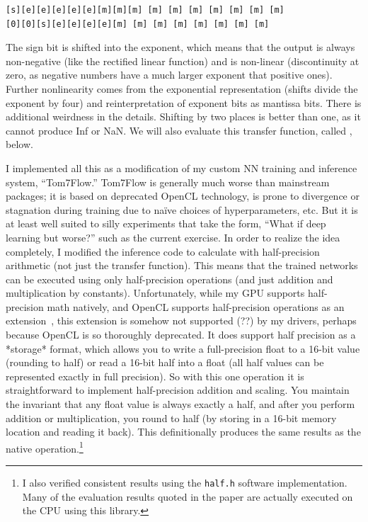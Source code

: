 \documentclass[twocolumn]{article}
\begin{document}
\begin{verbatim}
[s][e][e][e][e][e][m][m][m] [m] [m] [m] [m] [m] [m] [m]
[0][0][s][e][e][e][e][m] [m] [m] [m] [m] [m] [m] [m]
\end{verbatim}

The sign bit is shifted into the exponent, which means that the output
is always non-negative (like the rectified linear function) and is
non-linear (discontinuity at zero, as negative numbers have a much
larger exponent that positive ones). Further nonlinearity comes from
the exponential representation (shifts divide the exponent by four)
and reinterpretation of exponent bits as mantissa bits. There is
additional weirdness in the details. Shifting by two places is better
than one, as it cannot produce Inf or NaN.
We will also evaluate this transfer function, called \downshifttwo,
below.

I implemented all this as a modification of my custom NN training and
inference system, ``Tom7Flow.'' Tom7Flow is generally much worse than
mainstream packages; it is based on deprecated OpenCL technology, is
prone to divergence or stagnation during training due to na\"ive
choices of hyperparameters, etc. But it is at least well suited to
silly experiments that take the form, ``What if deep learning but
worse?'' such as the current exercise. In order to realize the idea
completely, I modified the inference code to calculate with
half-precision arithmetic (not just the transfer function). This means
that the trained networks can be executed using only half-precision
operations (and just addition and multiplication by constants).
Unfortunately, while my GPU supports half-precision math natively, and
OpenCL supports half-precision operations as an
extension~\cite{openclextensions}, this extension is somehow not
supported (??) by my drivers, perhaps because OpenCL is so thoroughly
deprecated. It does support half precision as a *storage* format,
which allows you to write a full-precision float to a 16-bit value
(rounding to half) or read a 16-bit half into a float (all half values
can be represented exactly in full precision). So with this one
operation it is straightforward to implement half-precision addition
and scaling. You maintain the invariant that any float value is always
exactly a half, and after you perform addition or multiplication, you
round to half (by storing in a 16-bit memory location and reading it
back). This definitionally produces the same results as the native
operation.\footnote{I also verified consistent results using the
  \verb+half.h+ software implementation. Many of the evaluation
  results quoted in the paper are actually executed on the CPU
  using this library.}
\end{document}
